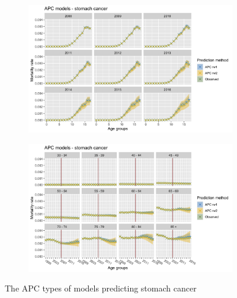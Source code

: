 \begin{figure}[h!]
    \centering
    \begin{subfigure}[b]{.45\linewidth}
        \includegraphics[width=\linewidth]{real-data/real-data-univariate/Figures/univariate-APC-by-age-stomach.png}
    \end{subfigure}
    \begin{subfigure}[b]{.45\linewidth}
        \includegraphics[width=\linewidth]{real-data/real-data-univariate/Figures/univariate-APC-by-period-stomach.png}
    \end{subfigure}
    \caption{The APC types of models predicting stomach cancer}
    \label{fig:uv-APC-stomach}
\end{figure}


